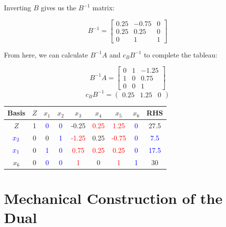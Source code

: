 \documentclass[12pt]{article}
\begin{document}
\noindent
Inverting $B$ gives us the $B^{-1}$ matrix:

\begin{equation*}
  B^{-1} = \begin{bmatrix}
    0.25 & -0.75 & 0 \\
    0.25 &  0.25 & 0 \\
       0 &     1 & 1
  \end{bmatrix}
\end{equation*}

\noindent
From here, we can calculate $B^{-1}A$ and $c_BB^{-1}$ to complete the tableau:

\begin{equation*}
  B^{-1}A = \begin{bmatrix}
    0 & 1 & -1.25 \\
    1 & 0 & 0.75 \\
    0 & 0 & 1
  \end{bmatrix}
\end{equation*}
\begin{equation*}
  c_BB^{-1} = \begin{pmatrix}
    0.25 & 1.25 & 0
  \end{pmatrix}
\end{equation*}

\begin{table}[h]
  \centering
  \begin{tabular}{c|c|ccc|ccc|c}
  Basis & $Z$ & $x_1$ & $x_2$ & $x_3$ & $x_4$ & $x_5$ & $x_6$ & RHS \\ \hline
  $Z$ & 1 & \textcolor{blue}{0} & \textcolor{blue}{0} & -0.25 & \textcolor{red}{0.25} & \textcolor{red}{1.25} & \textcolor{blue}{0} & 27.5 \\ \hline
  $\textcolor{blue}{x_2}$ & 0 & 0 & \textcolor{blue}{1} & \textcolor{red}{-1.25} & 0.25 & \textcolor{red}{-0.75} & \textcolor{blue}{0} & \textcolor{blue}{7.5} \\
  $\textcolor{blue}{x_1}$ & 0 & \textcolor{blue}{1} & \textcolor{blue}{0} & \textcolor{red}{0.75} & \textcolor{red}{0.25} & \textcolor{red}{0.25} & \textcolor{blue}{0} & \textcolor{blue}{17.5} \\
  $x_6$ & 0 & \textcolor{blue}{0} & \textcolor{blue}{0} & \textcolor{red}{1} & 0 & \textcolor{red}{1} & \textcolor{blue}{1} & 30
  \end{tabular}
\end{table}

%
%
\newpage
\section{Mechanical Construction of the Dual}
\end{document}
